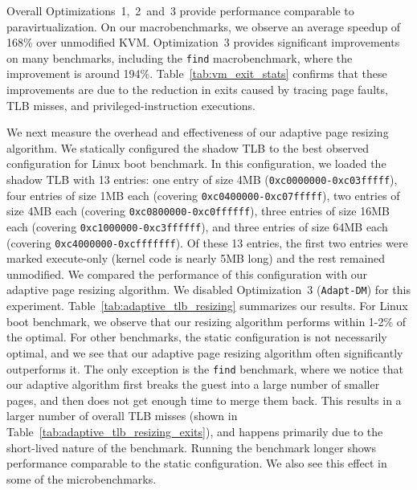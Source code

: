 \documentclass[10pt,twocolumn]{article}
\begin{document}
Overall Optimizations~1,~2~and~3 provide performance comparable to
paravirtualization. On our macrobenchmarks, we observe an
average speedup of 168\% over unmodified KVM. Optimization~3 provides
significant improvements on many benchmarks, including the {\tt find}
macrobenchmark, where the improvement is around 194\%.
Table~\ref{tab:vm_exit_stats} confirms that these improvements
are due to the
reduction in exits caused by tracing page faults, TLB misses, and
privileged-instruction executions.

We next measure the overhead and effectiveness
of our adaptive page resizing algorithm. We statically configured the
shadow TLB to the best observed configuration for Linux boot benchmark.
In this configuration, we loaded the shadow TLB with 13 entries:
one entry of size 4MB ({\tt 0xc0000000-0xc03fffff}), four entries
of size 1MB each (covering {\tt 0xc0400000-0xc07fffff}), two entries
of size 4MB each (covering {\tt 0xc0800000-0xc0ffffff}),
three entries of size 16MB each (covering {\tt 0xc1000000-0xc3ffffff}),
and three entries of size 64MB each (covering {\tt 0xc4000000-0xcfffffff}).
Of these 13 entries, the first two entries were marked
execute-only (kernel code is nearly 5MB long) and the
rest remained unmodified.
We compared the performance of this configuration with our adaptive page
resizing algorithm. We disabled Optimization~3 ({\tt Adapt-DM}) for this
experiment.
Table~\ref{tab:adaptive_tlb_resizing} summarizes our results.
For Linux boot benchmark, we observe that our resizing algorithm performs
within 1-2\% of the optimal. For other benchmarks, the static configuration
is not necessarily optimal, and we see that our
adaptive page resizing algorithm often significantly outperforms it.
The only exception is the {\tt find} benchmark, where we notice that
our adaptive algorithm first breaks the guest into a large number
of smaller pages, and then does not get enough time to merge them back. This
results in a larger number of overall TLB misses (shown in
Table~\ref{tab:adaptive_tlb_resizing_exits}), and happens primarily due
to the short-lived nature of the benchmark. Running the benchmark longer shows
performance comparable to the static configuration. We also
see this effect in some of the microbenchmarks.
\end{document}
